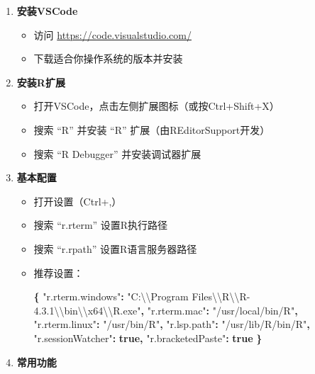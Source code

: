 \documentclass[
]{book}
\newenvironment{Shaded}{\begin{snugshade}}{\end{snugshade}}
\newcommand{\CharTok}[1]{\textcolor[rgb]{0.31,0.60,0.02}{#1}}
\newcommand{\DataTypeTok}[1]{\textcolor[rgb]{0.13,0.29,0.53}{#1}}
\newcommand{\FunctionTok}[1]{\textcolor[rgb]{0.13,0.29,0.53}{\textbf{#1}}}
\newcommand{\KeywordTok}[1]{\textcolor[rgb]{0.13,0.29,0.53}{\textbf{#1}}}
\newcommand{\StringTok}[1]{\textcolor[rgb]{0.31,0.60,0.02}{#1}}
\providecommand{\tightlist}{%
  \setlength{\itemsep}{0pt}\setlength{\parskip}{0pt}}
\begin{document}
\begin{enumerate}
\def\labelenumi{\arabic{enumi}.}
\tightlist
\item
  \textbf{安装VSCode}

  \begin{itemize}
  \tightlist
  \item
    访问 \url{https://code.visualstudio.com/}
  \item
    下载适合你操作系统的版本并安装
  \end{itemize}
\item
  \textbf{安装R扩展}

  \begin{itemize}
  \tightlist
  \item
    打开VSCode，点击左侧扩展图标（或按Ctrl+Shift+X）
  \item
    搜索 ``R'' 并安装 ``R'' 扩展（由REditorSupport开发）
  \item
    搜索 ``R Debugger'' 并安装调试器扩展
  \end{itemize}
\item
  \textbf{基本配置}

  \begin{itemize}
  \item
    打开设置（Ctrl+,）
  \item
    搜索 ``r.rterm'' 设置R执行路径
  \item
    搜索 ``r.rpath'' 设置R语言服务器路径
  \item
    推荐设置：

\begin{Shaded}
\begin{Highlighting}[]
\FunctionTok{\{}
  \DataTypeTok{"r.rterm.windows"}\FunctionTok{:} \StringTok{"C:}\CharTok{\textbackslash{}\textbackslash{}}\StringTok{Program Files}\CharTok{\textbackslash{}\textbackslash{}}\StringTok{R}\CharTok{\textbackslash{}\textbackslash{}}\StringTok{R{-}4.3.1}\CharTok{\textbackslash{}\textbackslash{}}\StringTok{bin}\CharTok{\textbackslash{}\textbackslash{}}\StringTok{x64}\CharTok{\textbackslash{}\textbackslash{}}\StringTok{R.exe"}\FunctionTok{,}
  \DataTypeTok{"r.rterm.mac"}\FunctionTok{:} \StringTok{"/usr/local/bin/R"}\FunctionTok{,}
  \DataTypeTok{"r.rterm.linux"}\FunctionTok{:} \StringTok{"/usr/bin/R"}\FunctionTok{,}
  \DataTypeTok{"r.lsp.path"}\FunctionTok{:} \StringTok{"/usr/lib/R/bin/R"}\FunctionTok{,}
  \DataTypeTok{"r.sessionWatcher"}\FunctionTok{:} \KeywordTok{true}\FunctionTok{,}
  \DataTypeTok{"r.bracketedPaste"}\FunctionTok{:} \KeywordTok{true}
\FunctionTok{\}}
\end{Highlighting}
\end{Shaded}
  \end{itemize}
\item
  \textbf{常用功能}


\end{enumerate}
\end{document}
